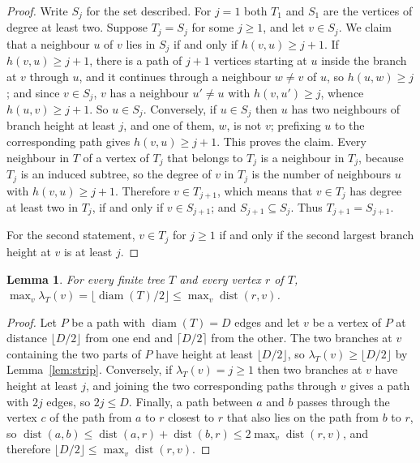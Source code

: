 \documentclass[11pt]{amsart}
\newtheorem{lemma}[theorem]{Lemma}
\theoremstyle{definition}
\theoremstyle{remark}
\numberwithin{equation}{section}
\newcommand{\diam}{\operatorname{diam}}
\begin{document}
\begin{proof}
Write $S_j$ for the set described. For $j=1$ both $T_1$ and $S_1$ are the vertices of degree at least two. Suppose $T_j=S_j$ for some $j\ge1$, and let $v\in S_j$. We claim that a neighbour $u$ of $v$ lies in $S_j$ if and only if $h(v,u)\ge j+1$. If $h(v,u)\ge j+1$, there is a path of $j+1$ vertices starting at $u$ inside the branch at $v$ through $u$, and it continues through a neighbour $w\ne v$ of $u$, so $h(u,w)\ge j$; and since $v\in S_j$, $v$ has a neighbour $u'\ne u$ with $h(v,u')\ge j$, whence $h(u,v)\ge j+1$. So $u\in S_j$. Conversely, if $u\in S_j$ then $u$ has two neighbours of branch height at least $j$, and one of them, $w$, is not $v$; prefixing $u$ to the corresponding path gives $h(v,u)\ge j+1$. This proves the claim. Every neighbour in $T$ of a vertex of $T_j$ that belongs to $T_j$ is a neighbour in $T_j$, because $T_j$ is an induced subtree, so the degree of $v$ in $T_j$ is the number of neighbours $u$ with $h(v,u)\ge j+1$. Therefore $v\in T_{j+1}$, which means that $v\in T_j$ has degree at least two in $T_j$, if and only if $v\in S_{j+1}$; and $S_{j+1}\subseteq S_j$. Thus $T_{j+1}=S_{j+1}$.

For the second statement, $v\in T_j$ for $j\ge1$ if and only if the second largest branch height at $v$ is at least $j$.
\end{proof}

\begin{lemma}\label{lem:diam}
For every finite tree $T$ and every vertex $r$ of $T$, $\max_v\lambda_T(v)=\lfloor\diam(T)/2\rfloor\le\max_v\operatorname{dist}(r,v)$.
\end{lemma}

\begin{proof}
Let $P$ be a path with $\diam(T)=D$ edges and let $v$ be a vertex of $P$ at distance $\lfloor D/2\rfloor$ from one end and $\lceil D/2\rceil$ from the other. The two branches at $v$ containing the two parts of $P$ have height at least $\lfloor D/2\rfloor$, so $\lambda_T(v)\ge\lfloor D/2\rfloor$ by Lemma~\ref{lem:strip}. Conversely, if $\lambda_T(v)=j\ge1$ then two branches at $v$ have height at least $j$, and joining the two corresponding paths through $v$ gives a path with $2j$ edges, so $2j\le D$. Finally, a path between $a$ and $b$ passes through the vertex $c$ of the path from $a$ to $r$ closest to $r$ that also lies on the path from $b$ to $r$, so $\operatorname{dist}(a,b)\le\operatorname{dist}(a,r)+\operatorname{dist}(b,r)\le2\max_v\operatorname{dist}(r,v)$, and therefore $\lfloor D/2\rfloor\le\max_v\operatorname{dist}(r,v)$.
\end{proof}
\end{document}
